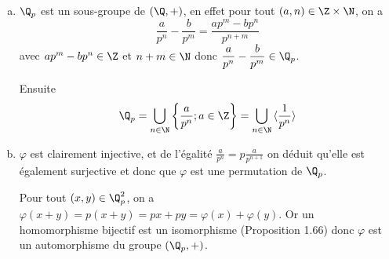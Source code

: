 \begin{enumerate}[a)]
  \item $\Q_p$ est un sous-groupe de $(\Q,+)$, en effet pour tout
    $(a,n)\in\Z\times\N$, on a
    \[
      \frac{a}{p^n}-\frac{b}{p^m} = \frac{ap^m-bp^n}{p^{n+m}}
    \]
    avec $ap^m-bp^n\in\Z$ et $n+m\in\N$ donc
    $\dfrac{a}{p^n}-\dfrac{b}{p^m}\in\Q_p$.

    Ensuite
    \[
      \Q_p = \bigcup_{n\in\N} \left\{\frac{a}{p^n}; a\in\Z\right\} =
        \bigcup_{n\in\N} \,\langle\frac{1}{p^n}\rangle
    \]

  \item $\varphi$ est clairement injective, et de l'égalité
    $\frac{a}{p^n} = p\frac{a}{p^{n+1}}$ on déduit qu'elle est également
    surjective et donc que $\varphi$ est une permutation de $\Q_p$.

    Pour tout $(x,y)\in\Q_p^2$, on a
    $\varphi(x+y) = p(x+y) = px+py = \varphi(x)+\varphi(y)$. Or un homomorphisme
    bijectif est un isomorphisme (Proposition 1.66) donc $\varphi$ est un
    automorphisme du groupe $(\Q_p,+)$.
\end{enumerate}
